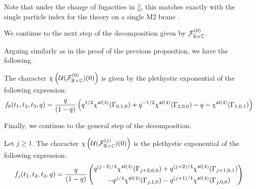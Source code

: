 Note that under the change of fugacities in \ref{}, this matches exactly with the single particle index for the theory on a single M2 brane \cite[Eq. (2.32)]{Bhattacharya:2008zy}.

\parsec[]
We continue to the next step of the decomposition given by $\mathcal{F}^{(0)}_{\mathbb{R}\times \mathbb{C}}$. 

Arguing similarly as in the proof of the previous proposition, we have the following.
\begin{prop}
The character $\chi \left ( \mathcal{U} (\mathcal{F}^{(0)}_{\mathbb{R}\times \mathbb{C}})(0)\right )$ is given by the plethystic exponential of the following expression:
\begin{equation}
f_0(t_1, t_2, t_3, q) = \frac{q}{(1-q)}\left ( q^{1/2}\chi^{\mathfrak{sl}(4)}(\Gamma_{0,1,0})  + q^{-1/2}\chi^{\mathfrak{sl}(4)}(\Gamma_{2,0,0})  - q - \chi^{\mathfrak{sl}(4)}(\Gamma_{1,0,1}) \right)
\end{equation}
\end{prop}

\parsec[]
Finally, we continue to the general step of the decomposition.

\begin{prop}
Let $j\geq 1$. The character $\chi \left ( \mathcal{U} (\mathcal{F}^{(j)}_{\mathbb{R}\times \mathbb{C}} ) (0)\right )$ is the plethystic exponential of the following expression:
\begin{equation}
f_j(t_1, t_2, t_3, q) = \frac{q}{(1-q)}\left (\begin{aligned} q^{(j-2)/4}\chi^{\mathfrak{sl}(4)}(\Gamma_{j+2,0,0})  &+ q^{(j+2)/4}\chi^{\mathfrak{sl}(4)}(\Gamma_{j+1,0,1}) \\ - q^{j/4}\chi^{\mathfrak{sl}(4)}(\Gamma_{j,1,0}) & - q^{(j+1)/4}\chi^{\mathfrak{sl}(4)}(\Gamma_{j,0,0}) \end{aligned}\right)
\end{equation}
\end{prop}

